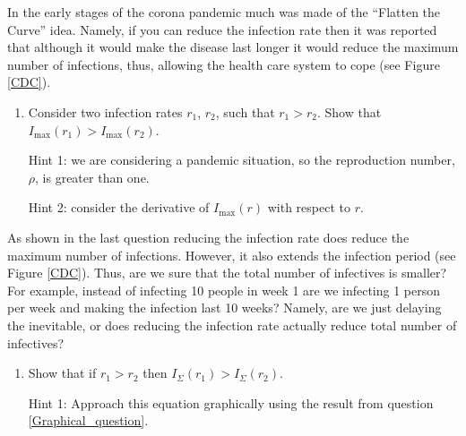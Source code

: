 \documentclass[10pt]{article}
\newcommand{\see}[1]{(see Figure \ref{#1})}
\newcounter{Counter1}
\begin{document}
In the early stages of the corona pandemic much was made of the ``Flatten the Curve'' idea. Namely, if you can reduce the infection rate then it was reported that although it would make the disease last longer it would reduce the maximum number of infections, thus, allowing the health care system to cope  \see{CDC}.
\begin{enumerate}
\setcounter{enumi}{\value{Counter1}}
\item Consider two infection rates $r_1$, $r_2$, such that $r_1>r_2$. Show that $I_{\textrm{max}}(r_1)>I_{\textrm{max}}(r_2)$.

Hint 1: we are considering a pandemic situation, so the reproduction number, $\rho$, is greater than one.

Hint 2: consider the derivative of $I_{\textrm{max}}(r)$ with respect to $r$.
\setcounter{Counter1}{\value{enumi}}
\end{enumerate}
As shown in the last question reducing the infection rate does reduce the maximum number of infections. However, it also extends the infection period \see{CDC}. Thus, are we sure that the total number of infectives is smaller? For example, instead of infecting 10 people in week 1 are we infecting 1 person per week and making the infection last 10 weeks?  Namely, are we just delaying the inevitable, or does reducing the infection rate actually reduce total number of infectives?
\begin{enumerate}
\setcounter{enumi}{\value{Counter1}}
\item  Show that if $r_1>r_2$ then $I_{\Sigma}(r_1)>I_{\Sigma}(r_2)$.


Hint 1: Approach this equation graphically using the result from question \ref{Graphical_question}.
\end{enumerate}
\end{document}

